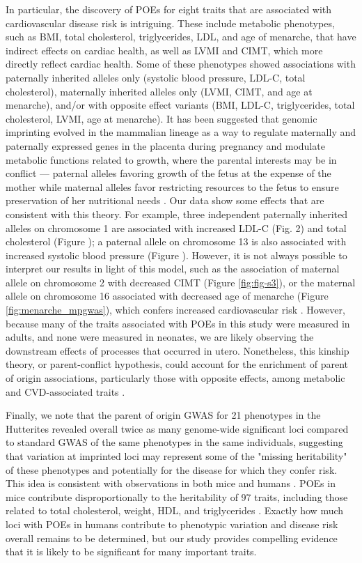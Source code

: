  In particular, the discovery of POEs for eight traits that are associated with cardiovascular disease risk is intriguing. These include metabolic phenotypes, such as BMI, total cholesterol, triglycerides, LDL, and age of menarche, that have indirect effects on cardiac health, as well as LVMI and CIMT, which more directly reflect cardiac health. Some of these phenotypes showed associations with paternally inherited alleles only (systolic blood pressure, LDL-C, total cholesterol), maternally inherited alleles only (LVMI, CIMT, and age at menarche), and/or with opposite effect variants (BMI, LDL-C, triglycerides, total cholesterol, LVMI, age at menarche). It has been suggested that genomic imprinting evolved in the mammalian lineage as a way to regulate maternally and paternally expressed genes in the placenta during pregnancy and modulate metabolic functions related to growth, where the parental interests may be in conflict — paternal alleles favoring growth of the fetus at the expense of the mother while maternal alleles favor restricting resources to the fetus to ensure preservation of her nutritional needs \cite{Haig:2000if,Barlow:2014dv,Patten:2016cb}. Our data show some effects that are consistent with this theory. For example, three independent paternally inherited alleles on chromosome 1 are associated with increased LDL-C (Fig. 2) and total cholesterol (Figure \label{fig:fig-s7}); a paternal allele on chromosome 13 is also associated with increased systolic blood pressure (Figure \label{fig:fig-s6}). However, it is not always possible to interpret our results in light of this model, such as the association of maternal allele on chromosome 2 with decreased CIMT (Figure \ref{fig:fig-s3}), or the maternal allele on chromosome 16 associated with decreased age of menarche (Figure  \ref{fig:menarche_mpgwas}), which confers increased cardiovascular risk \cite{Canoy:2015ha}. However, because many of the traits associated with POEs in this study were measured in adults, and none were measured in neonates, we are likely observing the downstream effects of processes that occurred in utero. Nonetheless, this kinship theory, or parent-conflict hypothesis, could account for the enrichment of parent of origin associations, particularly those with opposite effects, among metabolic and CVD-associated traits \cite{Peters2014}.
 
 Finally, we note that the parent of origin GWAS for 21 phenotypes in the Hutterites revealed overall twice as many genome-wide significant loci compared to standard GWAS of the same phenotypes in the same individuals, suggesting that variation at imprinted loci may represent some of the "missing heritability" of these phenotypes and potentially for the disease for which they confer risk. This idea is consistent with observations in both mice and humans \cite{Laurin:2017jv}. POEs in mice contribute disproportionally to the heritability of 97 traits, including those related to total cholesterol, weight, HDL, and triglycerides \cite{Mott2014}. Exactly how much loci with POEs in humans contribute to phenotypic variation and disease risk overall remains to be determined, but our study provides compelling evidence that it is likely to be significant for many important traits.


